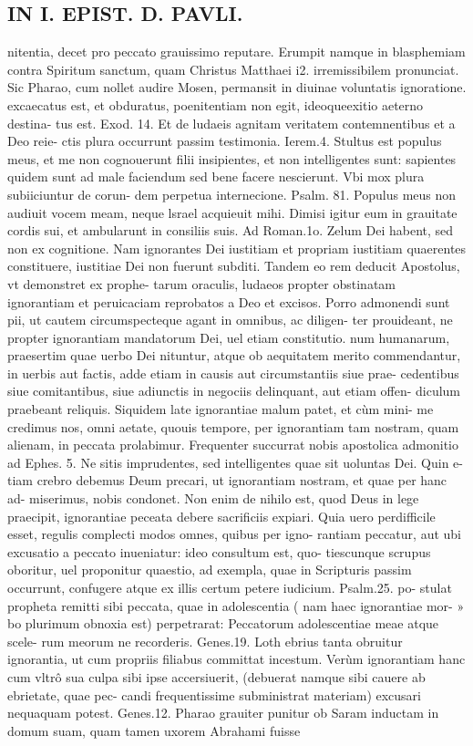 \documentclass{article}
\begin{document}
\begin{pages}
\section*{IN I. EPIST. D. PAVLI. }
\marginpar{[ p.43 ]}\pstart nitentia, decet pro peccato grauissimo reputare. Erumpit namque in blasphemiam contra Spiritum sanctum, quam Christus Matthaei i2. irremissibilem pronunciat. Sic Pharao, cum nollet audire Mosen, permansit in diuinae voluntatis ignoratione. excaecatus est, et obduratus, poenitentiam non egit, ideoqueexitio aeterno destina- tus est. Exod. 14. Et de ludaeis agnitam veritatem contemnentibus et a Deo reie-   ctis plura occurrunt passim testimonia. Ierem.4. Stultus est populus meus, et me   non cognouerunt filii insipientes, et non intelligentes sunt: sapientes quidem sunt ad male faciendum sed bene facere nescierunt. Vbi mox plura subiiciuntur de corun-   dem perpetua internecione. Psalm. 81. Populus meus non audiuit vocem meam,   neque lsrael acquieuit mihi. Dimisi igitur eum in grauitate cordis sui, et ambularunt   in consiliis suis. Ad Roman.1o. Zelum Dei habent, sed non ex cognitione. Nam   ignorantes Dei iustitiam et propriam iustitiam quaerentes constituere, iustitiae Dei   non fuerunt subditi. Tandem eo rem deducit Apostolus, vt demonstret ex prophe- tarum oraculis, ludaeos propter obstinatam ignorantiam et peruicaciam reprobatos a Deo et excisos.  \pend\pstart Porro admonendi sunt pii, ut cautem circumspecteque  agant in omnibus, ac diligen- ter prouideant, ne propter ignorantiam mandatorum Dei, uel etiam constitutio. num humanarum, praesertim quae uerbo Dei nituntur, atque ob aequitatem merito commendantur, in uerbis aut factis, adde etiam in causis aut circumstantiis siue prae- cedentibus siue comitantibus, siue adiunctis in negociis delinquant, aut etiam offen- diculum praebeant reliquis. Siquidem late ignorantiae malum patet, et cùm mini- me credimus nos, omni aetate, quouis tempore, per ignorantiam tam nostram, quam alienam, in peccata prolabimur. Frequenter succurrat nobis apostolica admonitio ad Ephes. 5. Ne sitis imprudentes, sed intelligentes quae sit uoluntas Dei. Quin e- tiam crebro debemus Deum precari, ut ignorantiam nostram, et quae per hanc ad- miserimus, nobis condonet. Non enim de nihilo est, quod Deus in lege praecipit, ignorantiae peceata debere sacrificiis expiari.  \pend\pstart Quia uero perdifficile esset, regulis complecti modos omnes, quibus per igno- rantiam peccatur, aut ubi excusatio a peccato inueniatur: ideo consultum est, quo- tiescunque  scrupus oboritur, uel proponitur quaestio, ad exempla, quae in Scripturis passim occurrunt, confugere atque ex illis certum petere iudicium. Psalm.25. po- stulat propheta remitti sibi peccata, quae in adolescentia ( nam haec ignorantiae mor- » bo plurimum obnoxia est) perpetrarat: Peccatorum adolescentiae meae atque scele- rum meorum ne recorderis. Genes.19. Loth ebrius tanta obruitur ignorantia, ut cum propriis filiabus committat incestum. Verùm ignorantiam hanc cum vltrô sua culpa sibi ipse accersiuerit, (debuerat namque sibi cauere ab ebrietate, quae pec- candi frequentissime subministrat materiam) excusari nequaquam potest. Genes.12. Pharao grauiter punitur ob Saram inductam in domum suam, quam tamen uxorem Abrahami fuisse 
\end{pages}
\end{document}
